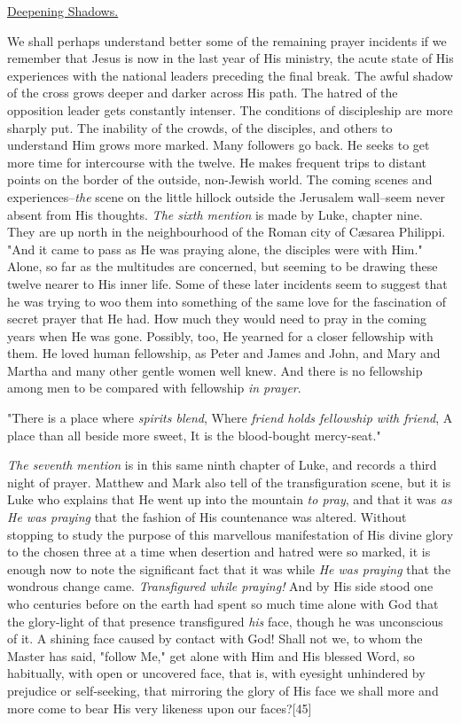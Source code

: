 \underline{Deepening Shadows.}


We shall perhaps understand better some of the remaining prayer incidents
if we remember that Jesus is now in the last year of His ministry, the
acute state of His experiences with the national leaders preceding the
final break. The awful shadow of the cross grows deeper and darker across
His path. The hatred of the opposition leader gets constantly intenser.
The conditions of discipleship are more sharply put. The inability of the
crowds, of the disciples, and others to understand Him grows more marked.
Many followers go back. He seeks to get more time for intercourse with
the twelve. He makes frequent trips to distant points on the border of the
outside, non-Jewish world. The coming scenes and experiences--\textit{the} scene
on the little hillock outside the Jerusalem wall--seem never absent from
His thoughts. \textit{The sixth mention} is made by Luke, chapter nine. They are
up north in the neighbourhood of the Roman city of Cæsarea Philippi. "And
it came to pass as He was praying alone, the disciples were with Him."
Alone, so far as the multitudes are concerned, but seeming to be drawing
these twelve nearer to His inner life. Some of these later incidents seem
to suggest that he was trying to woo them into something of the same love
for the fascination of secret prayer that He had. How much they would need
to pray in the coming years when He was gone. Possibly, too, He yearned
for a closer fellowship with them. He loved human fellowship, as Peter and
James and John, and Mary and Martha and many other gentle women well knew.
And there is no fellowship among men to be compared with fellowship \textit{in
prayer}.

    "There is a place where \textit{spirits blend},
    Where \textit{friend holds fellowship with friend},
    A place than all beside more sweet,
    It is the blood-bought mercy-seat."

\textit{The seventh mention} is in this same ninth chapter of Luke, and records a
third night of prayer. Matthew and Mark also tell of the transfiguration
scene, but it is Luke who explains that He went up into the mountain \textit{to
pray}, and that it was \textit{as He was praying} that the fashion of His
countenance was altered. Without stopping to study the purpose of this
marvellous manifestation of His divine glory to the chosen three at a time
when desertion and hatred were so marked, it is enough now to note the
significant fact that it was while \textit{He was praying} that the wondrous
change came. \textit{Transfigured while praying!} And by His side stood one who
centuries before on the earth had spent so much time alone with God that
the glory-light of that presence transfigured \textit{his} face, though he was
unconscious of it. A shining face caused by contact with God! Shall not
we, to whom the Master has said, "follow Me," get alone with Him and His
blessed Word, so habitually, with open or uncovered face, that is, with
eyesight unhindered by prejudice or self-seeking, that mirroring the glory
of His face we shall more and more come to bear His very likeness upon our
faces?[45]

